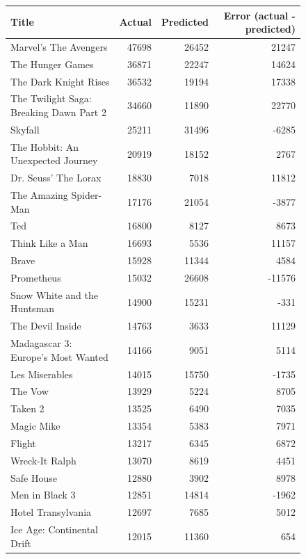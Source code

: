 \documentclass[10pt]{article}
\begin{document}
    \begin{figure}[ht]
        \scriptsize
        \centering
        \begin{tabular}{l|r|r|r}
            Title & Actual & Predicted & Error (actual - predicted) \\
            \hline
            Marvel's The Avengers & 47698 & 26452 & 21247 \\
            The Hunger Games & 36871 & 22247 & 14624 \\
            The Dark Knight Rises & 36532 & 19194 & 17338 \\
            The Twilight Saga: Breaking Dawn Part 2 & 34660 & 11890 & 22770 \\
            Skyfall & 25211 & 31496 & -6285 \\
            The Hobbit: An Unexpected Journey & 20919 & 18152 & 2767 \\
            Dr. Seuss' The Lorax & 18830 & 7018 & 11812 \\
            The Amazing Spider-Man & 17176 & 21054 & -3877 \\
            Ted & 16800 & 8127 & 8673 \\
            Think Like a Man & 16693 & 5536 & 11157 \\
            Brave & 15928 & 11344 & 4584 \\
            Prometheus & 15032 & 26608 & -11576 \\
            Snow White and the Huntsman & 14900 & 15231 & -331 \\
            The Devil Inside & 14763 & 3633 & 11129 \\
            Madagascar 3: Europe's Most Wanted & 14166 & 9051 & 5114 \\
            Les Miserables & 14015 & 15750 & -1735 \\
            The Vow & 13929 & 5224 & 8705 \\
            Taken 2 & 13525 & 6490 & 7035 \\
            Magic Mike & 13354 & 5383 & 7971 \\
            Flight & 13217 & 6345 & 6872 \\
            Wreck-It Ralph & 13070 & 8619 & 4451 \\
            Safe House & 12880 & 3902 & 8978 \\
            Men in Black 3 & 12851 & 14814 & -1962 \\
            Hotel Transylvania & 12697 & 7685 & 5012 \\
            Ice Age: Continental Drift & 12015 & 11360 & 654 \\

\end{tabular}
\end{figure}
\end{document}
